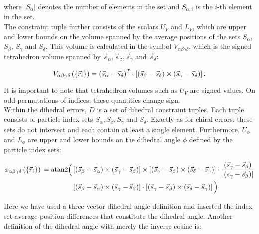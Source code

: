 \documentclass[a4paper]{article}
\begin{document}
where $|S_\alpha|$ denotes the number of elements in the set and $S_{\alpha,
i}$ is the $i$-th element in the set.\\

The constraint tuple further consists of the scalars $U_{V}$ and
$L_{V}$, which are upper and lower bounds on
the volume spanned by the average positions of the sets $S_\alpha$, $S_\beta$,
$S_\gamma$ and $S_\delta$. This volume is
calculated in the symbol $V_{\alpha\beta\gamma\delta}$, which is the signed
tetrahedron volume spanned by $\vec{s}_\alpha, \vec{s}_\beta, \vec{s}_\gamma$
and $\vec{s}_\delta$:

\begin{equation}
  V_{\alpha\beta\gamma\delta}\left( \left\{\vec{r}_i \right\} \right) =
    \left(\vec{s}_{\alpha}-\vec{s}_{\delta}\right)^{T} \cdot \left[ \left(\vec{s}_{\beta}-\vec{s}_{\delta}\right) \times\left(\vec{s}_{\gamma}-\vec{s}_{\delta}\right) \right].
\end{equation}

It is important to note that tetrahedron volumes such as
$U_{V}$ are signed values. On odd permutations of indices, these quantities
change sign.\\

Within the dihedral errors, $D$ is a set of dihedral constraint tuples.
Each tuple consists of particle index sets $S_\alpha, S_\beta, S_\gamma$ and
$S_\delta$. Exactly as for chiral errors, these sets do not intersect and each
contain at least a single element. Furthermore, $U_{\phi}$ and $L_{\phi}$ are
upper and lower bounds on the dihedral angle $\phi$ defined by the particle
index sets:

\begin{align}\begin{aligned}
  \phi_{\alpha\beta\gamma\delta}\left(\left\{\vec{r}_i \right\}\right){} = \textrm{atan2} \Big( &
    \left[
      \left(\vec{s}_{\beta}-\vec{s}_{\alpha}\right) \times \left(\vec{s}_{\gamma}-\vec{s}_{\beta}\right)
    \right] \times \left[
      \left(\vec{s}_{\gamma}-\vec{s}_{\beta}\right) \times \left(\vec{s}_{\delta}-\vec{s}_{\gamma}\right)
    \right] \cdot 
    \frac{\left(\vec{s}_{\gamma}-\vec{s}_{\beta}\right)}{\lvert\left(\vec{s}_{\gamma}-\vec{s}_{\beta}\right)\rvert}\\
    & \left[
      \left(\vec{s}_{\beta}-\vec{s}_{\alpha}\right) \times \left(\vec{s}_{\gamma}-\vec{s}_{\beta}\right)
    \right] \cdot \left[
      \left(\vec{s}_{\gamma}-\vec{s}_{\beta}\right) \times \left(\vec{s}_{\delta}-\vec{s}_{\gamma}\right)
    \right]
  \Big)
\end{aligned}\end{align}

Here we have used a three-vector dihedral angle definition and inserted
the index set average-position differences that constitute the dihedral angle.
Another definition of the dihedral angle with merely the inverse cosine is:\\
\end{document}
